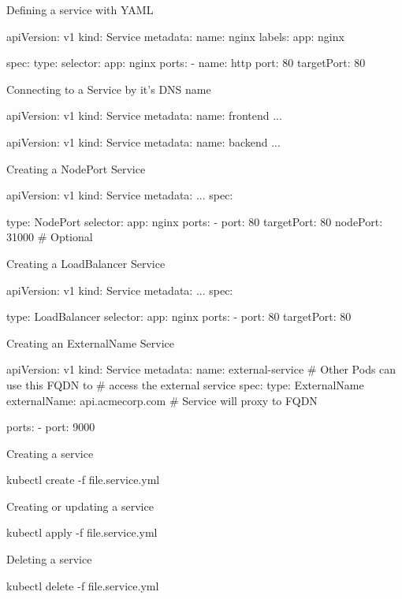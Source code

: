 \documentclass{refcard}
\begin{document}
Defining a service with YAML
\begin{yamlbox}[title={Defining a service}]
apiVersion: v1
kind: Service
metadata:
  name: nginx
  labels:
    app: nginx
    
spec:
  type:
  selector:
    app: nginx
  ports:
  - name: http
    port: 80
    targetPort: 80 
\end{yamlbox}

Connecting to a Service by it's DNS name
\begin{yamlbox}[title={Connecting a service}]
apiVersion: v1
kind: Service
metadata:
  name: frontend
  ...

apiVersion: v1
kind: Service
metadata:
  name: backend
  ...
\end{yamlbox}

Creating a NodePort Service
\begin{yamlbox}[title={Creating a NodePort Service}]
apiVersion: v1
kind: Service
metadata:
  ...
spec:

  type: NodePort
  selector:
    app: nginx
  ports:
  - port: 80
    targetPort: 80
    nodePort: 31000 # Optional
\end{yamlbox}

Creating a LoadBalancer Service
\begin{yamlbox}[title={Creating a LoadBalancer Service}]
apiVersion: v1
kind: Service
metadata:
  ...
spec:

  type: LoadBalancer
  selector:
    app: nginx
  ports:
  - port: 80
    targetPort: 80
\end{yamlbox}

Creating an ExternalName Service
\begin{yamlbox}[title={Creating an ExternalName Service}]
apiVersion: v1
kind: Service
metadata:
  name: external-service
  # Other Pods can use this FQDN to 
  # access the external service
spec:
  type: ExternalName
  externalName: api.acmecorp.com 
  # Service will proxy to FQDN
  
  ports:
  - port: 9000
\end{yamlbox}

Creating a service
\begin{ttyenv}
kubectl create -f file.service.yml
\end{ttyenv}

Creating or updating a service
\begin{ttyenv}
kubectl apply  -f file.service.yml
\end{ttyenv}

Deleting a service
\begin{ttyenv}
kubectl delete  -f file.service.yml
\end{ttyenv}
\end{document}
